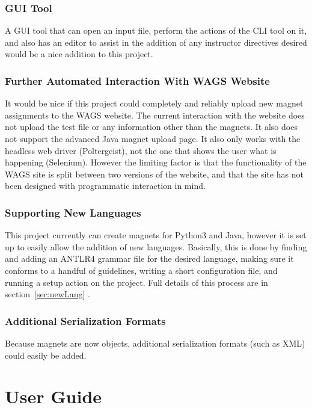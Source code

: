 \documentclass[letter,10pt]{article}
\begin{document}
\subsubsection{GUI Tool}

A GUI tool that can open an input file, perform the actions of the CLI 
tool on it, and also has an editor to assist in the addition of any 
instructor directives desired would be a nice addition to this project.

\subsubsection{Further Automated Interaction With WAGS Website}
It would be nice if this project could completely and reliably upload 
new magnet assignments to the WAGS website. The current interaction 
with the website does not upload the test file or any information other 
than the magnets. It also does not support the advanced Java magnet 
upload page. It also only works with the headless web driver 
(Poltergeist), not the one that shows the user what is happening 
(Selenium). However the limiting factor is that the functionality of 
the WAGS site is split between two versions of the website, and that 
the site has not been designed with programmatic interaction in mind.

\subsubsection{Supporting New Languages}

This project currently can create magnets for Python3 and Java, however 
it is set up to easily allow the addition of new languages. 
Basically, this is done by finding and adding an ANTLR4 grammar file 
for the desired language, making sure it conforms to a handful of 
guidelines, writing a short configuration file, and running a setup 
action on the project. Full details of this process are in 
section~\ref{sec:newLang} .


\subsubsection{Additional Serialization Formats}

Because magnets are now objects, additional serialization formats (such 
as XML) could easily be added. 



\section{User Guide}
\end{document}

